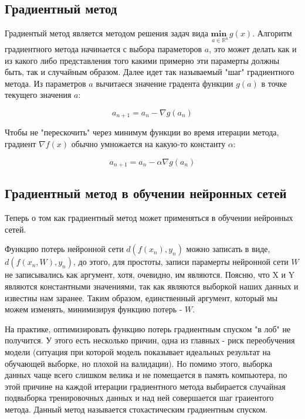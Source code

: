 \documentclass{article}
\begin{document}
\subsection{Градиентный метод}
Градиентый метод является методом решения задач вида $\underset{a \in \mathds{R}^n}{\textbf{min }} g(x)$. Алгоритм градиентного метода начинается с выбора
параметоров $a$, это может делать как и из какого либо представления того какими примерно эти парамерты должны быть, так и случайным образом. Далее
идет так называемый "шаг" градиентного метода. Из параметров $a$ вычитаеся значение градента функции $g(a)$ в точке текущего значения $a$:

$$ a_{n + 1} = a_n - \nabla g(a_n)$$

Чтобы не "перескочить" через минимум функции во время итерации метода, градиент $\nabla f(x)$ обычно умножается на какую-то константу $\alpha$:

$$ a_{n + 1} = a_n - \alpha \nabla g(a_n)$$

\subsection{Градиентный метод в обучении нейронных сетей}
Теперь о том как градиентный метод может применяться в обучении нейронных сетей.

Функцию потерь нейронной сети $d(f(x_n), y_n)$ можно записать в виде, $d(f(x_n, W), y_n)$, до этого, для простоты, записи парамерты нейронной сети $W$ не записывались
как аргумент, хотя, очевидно, им являются. Поясню, что X и Y являются константными значениями, так как являются выборкой наших
данных и известны нам заранее. Таким образом, единственный аргумент, который мы можем изменять, минимизируя функцию потерь - $W$.

На практике, оптимизировать функцию потерь градиентным спуском "в лоб" не получится. У этого есть несколько причин, одна из главных - риск переобучения
модели (ситуация при которой модель показывает идеальных результат на обучающей выборке, но плохой на валидации). Но помимо этого, выборка данных
чаще всего слишком велика и не помещается в память компьютера, по этой причине на каждой итерации градиентного метода выбирается случайная подвыборка
тренировочных данных и над ней совершается шаг граиентого метода. Данный метод называется стохастическим градиентным спуском.
\end{document}
